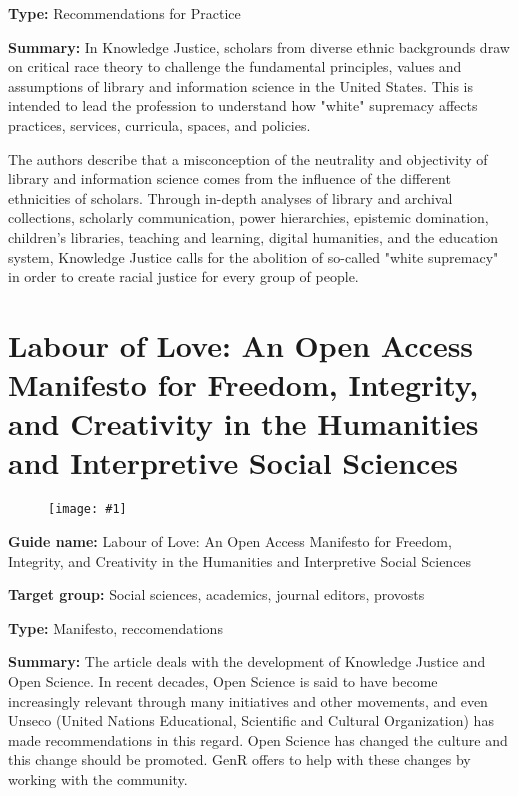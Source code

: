 \documentclass{article}
\newlength{\imgwidth}
\newcommand\scaledgraphics[2]{%
                
\settowidth{\imgwidth}{\texttt{[image: \#1]}}%
                
\setlength{\imgwidth}{\minof{\imgwidth}{#2\textwidth}}%
                
\texttt{[image: \#1]}%
                
}
\begin{document}
\textbf{Type:} Recommendations for Practice


\textbf{Summary: }In Knowledge Justice, scholars from diverse ethnic backgrounds draw on critical race theory to challenge the fundamental principles, values and assumptions of library and information science in the United States. This is intended to lead the profession to understand how "white" supremacy affects practices, services, curricula, spaces, and policies.


The authors describe that a misconception of the neutrality and objectivity of library and information science comes from the influence of the different ethnicities of scholars. Through in-depth analyses of library and archival collections, scholarly communication, power hierarchies, epistemic domination, children's libraries, teaching and learning, digital humanities, and the education system, Knowledge Justice calls for the abolition of so-called "white supremacy" in order to create racial justice for every group of people.


\section{Labour of Love: An Open Access Manifesto for Freedom, Integrity, and Creativity in the Humanities and Interpretive Social Sciences}\label{H4374482}



\begin{center}
\begin{figure}
\scaledgraphics{e590694e-3a8f-4a2f-801f-704d7d8edbc0.png}{0.75}
\label{F3873651}
\end{figure}


\end{center}


\textbf{Guide name: }Labour of Love: An Open Access Manifesto for Freedom, Integrity, and Creativity in the Humanities and Interpretive Social Sciences\textbf{ }\autocite{pia_labour_2020}


\textbf{Target group: }Social sciences, academics, journal editors, provosts


\textbf{Type:} Manifesto, reccomendations


\textbf{Summary:} The article deals with the development of Knowledge Justice and Open Science. In recent decades, Open Science is said to have become increasingly relevant through many initiatives and other movements, and even Unseco (United Nations Educational, Scientific and Cultural Organization) has made recommendations in this regard. Open Science has changed the culture and this change should be promoted. GenR offers to help with these changes by working with the community.
\end{document}
